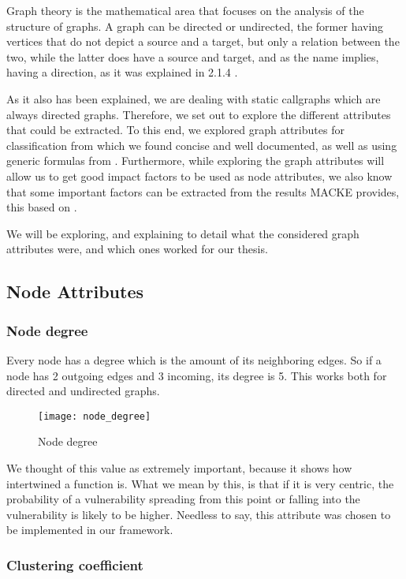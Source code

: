 Graph theory \parencite{graphs} is the mathematical area that focuses on the analysis of the structure of graphs. A graph can be directed or undirected, the former having vertices that do not depict a source and a target, but only a relation between the two, while the latter does have a source and target, and as the name implies, having a direction, as it was explained in 2.1.4 .

As it also has been explained, we are dealing with static callgraphs which are always directed graphs. Therefore, we set out to explore the different attributes that could be extracted. To this end, we explored graph attributes for classification from \parencite{graphClassification} which we found concise and well documented, as well as using generic formulas from \parencite{graphs}. Furthermore, while exploring the graph attributes will allow us to get good impact factors to be used as node attributes, we also know that some important factors can be extracted from the results MACKE provides, this based on \parencite{ognawala}.

We will be exploring, and explaining to detail what the considered graph attributes were, and which ones worked for our thesis.

\subsection{Node Attributes}

\subsubsection{Node degree}

Every node has a degree which is the amount of its neighboring edges. So if a node has 2 outgoing edges and 3 incoming, its degree is 5. This works both for directed and undirected graphs.

\begin{figure}[!htb]
	\caption{Node degree}
	\centering
	\texttt{[image: node\_degree]}
\end{figure}

We thought of this value as extremely important, because it shows how intertwined a function is. What we mean by this, is that if it is very centric, the probability of a vulnerability spreading from this point or falling into the vulnerability is likely to be higher. Needless to say, this attribute was chosen to be implemented in our framework.

\subsubsection{Clustering coefficient}

